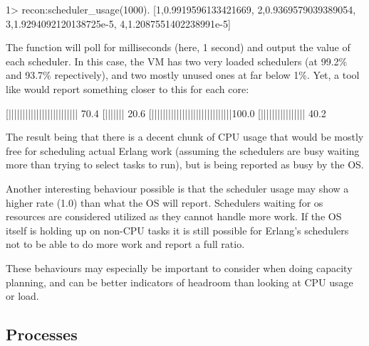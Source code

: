 \documentclass[11pt, oneside]{book}   	%
\begin{document}
\begin{VerbatimEshell}
1> recon:scheduler_usage(1000).
[{1,0.9919596133421669},
 {2,0.9369579039389054},
 {3,1.9294092120138725e-5},
 {4,1.2087551402238991e-5}]
\end{VerbatimEshell}

The function  will poll for  milliseconds (here, 1 second) and output the value of each scheduler. In this case, the VM has two very loaded schedulers (at 99.2\% and 93.7\% repectively), and two mostly unused ones at far below 1\%. Yet, a tool like  would report something closer to this for each core:

\begin{VerbatimText}
[|||||||||||||||||||||||||     70.4%
[|||||||                       20.6%
[|||||||||||||||||||||||||||||100.0%
[||||||||||||||||              40.2%
\end{VerbatimText}

The result being that there is a decent chunk of CPU usage that would be mostly free for scheduling actual Erlang work (assuming the schedulers are busy waiting more than trying to select tasks to run), but is being reported as busy by the OS.

Another interesting behaviour possible is that the scheduler usage may show a higher rate (1.0) than what the OS will report. Schedulers waiting for os resources are considered utilized as they cannot handle more work. If the OS itself is holding up on non-CPU tasks it is still possible for Erlang's schedulers not to be able to do more work and report a full ratio.

These behaviours may especially be important to consider when doing capacity planning, and can be better indicators of headroom than looking at CPU usage or load.


\subsection{Processes}
\label{subsec:global-procs}
\end{document}
